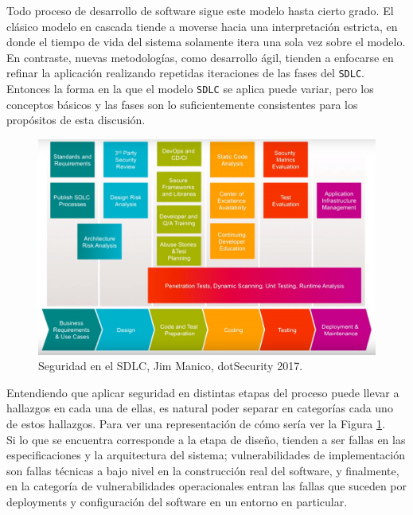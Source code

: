 Todo proceso de desarrollo de software sigue este modelo hasta cierto grado. El clásico modelo en cascada tiende a moverse hacia una interpretación estricta, en donde el tiempo de vida del sistema solamente itera una sola vez sobre el modelo. En contraste, nuevas metodologías, como desarrollo ágil\cite{ries2012metodo}, tienden a enfocarse en refinar la aplicación realizando repetidas iteraciones de las fases del \texttt{SDLC}. Entonces la forma en la que el modelo \texttt{SDLC} se aplica puede variar, pero los conceptos básicos y las fases son lo suficientemente consistentes para los propósitos de esta discusión.\\

\begin{figure}[ht]
    \centering
    \includegraphics[scale=0.19]{images/JimManicodeSSDLC.png}
    \caption{Seguridad en el SDLC, Jim Manico, dotSecurity 2017.}
    \label{fig:ssdlc}
\end{figure}

Entendiendo que aplicar seguridad en distintas etapas del proceso puede llevar a hallazgos en cada una de ellas, es natural poder separar en categorías cada uno de estos hallazgos. Para ver una representación de cómo sería ver la Figura \ref{fig:ssdlc}.\\

Si lo que se encuentra corresponde a la etapa de diseño, tienden a ser fallas en las especificaciones y la arquitectura del sistema; vulnerabilidades de implementación son fallas técnicas a bajo nivel en la construcción real del software, y finalmente, en la categoría de vulnerabilidades operacionales  entran las fallas que suceden por deployments y configuración del software en un entorno en particular.\\

